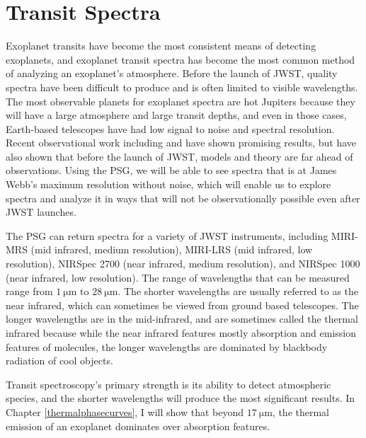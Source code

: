\chapter{Transit Spectra}
\label{spectra}
Exoplanet transits have become the most consistent means of detecting
 exoplanets, and exoplanet transit spectra has become the most common method of
 analyzing an exoplanet's atmosphere. Before the launch of JWST, quality
 spectra have been difficult to produce and is often limited to visible wavelengths. The
 most observable planets for exoplanet spectra are hot Jupiters because they will have
 a large atmosphere and large transit depths, and even in those cases,
 Earth-based telescopes have had low signal to noise and spectral resolution.
 Recent observational work including \citet{essenwasp33b} and
 \citet{ducrottrappistspectra} have shown promising results, but have also shown
 that before the launch of JWST, models and theory are far ahead of
 observations. Using the PSG, we will be able to see spectra that is at James
 Webb's maximum resolution without noise, which will enable us to explore
 spectra and analyze
 it in ways that will not be observationally possible even after JWST
 launches.

The PSG can return spectra for a variety of JWST instruments, including
 MIRI-MRS (mid infrared, medium resolution), MIRI-LRS (mid infrared, low
 resolution), NIRSpec 2700 (near infrared, medium resolution), and NIRSpec 1000
 (near infrared, low resolution). The range of wavelengths that can be measured
 range from $\SI{1}{\micro\meter}$ to $\SI{28}{\micro\meter}$. The shorter
 wavelengths are usually referred to as the near infrared, which can sometimes
 be viewed from ground based telescopes. The longer wavelengths are in the
 mid-infrared, and are sometimes called the thermal infrared because while the
 near infrared features mostly absorption and emission features of molecules,
 the longer wavelengths are dominated by blackbody radiation of cool objects.

Transit spectroscopy's primary strength is its ability to detect atmospheric
 species, and the shorter wavelengths will produce the most significant results.
 In Chapter \ref{thermalphasecurves}, I will show that beyond
 $\SI{17}{\micro\meter}$, the thermal
 emission of an exoplanet dominates over absorption features.

